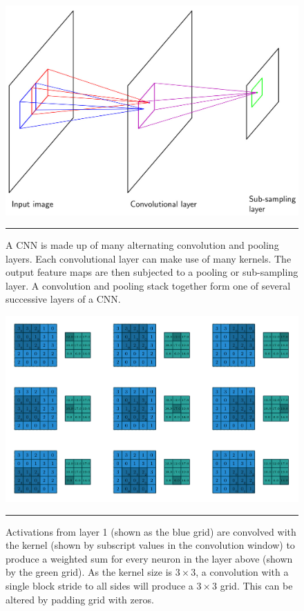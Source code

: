 \begin{figure}[htbp]
	\centering
		\includegraphics[width = 1.0\textwidth]{./Figures/pattern_recognition_and_machine_learning_CNN.jpg} %
		\rule{35em}{0.5pt}
	\caption[A CNN Layer]{A CNN is made up of many alternating convolution and pooling layers. Each convolutional layer can make use of many kernels. The output feature maps are then subjected to a pooling or sub-sampling layer. A convolution and pooling stack together form one of several successive layers of a CNN.}
	\label{fig:CNN_2}
\end{figure}
\begin{figure}[htbp]
	\centering
		\includegraphics[width = 1.0\textwidth]{./Figures/1603_07285v1_convolving.PNG} %
		\rule{35em}{0.5pt}
	\caption[Convolution]{Activations from layer 1 (shown as the blue grid) are convolved with the kernel (shown by subscript values in the convolution window) to produce a weighted sum for every neuron in the layer above (shown by the green grid). As the kernel size is $3\times 3$, a convolution with a single block stride to all sides will produce a $3\times 3$ grid. This can be altered by padding grid with zeros.}
	\label{fig:Convolution}
\end{figure}

